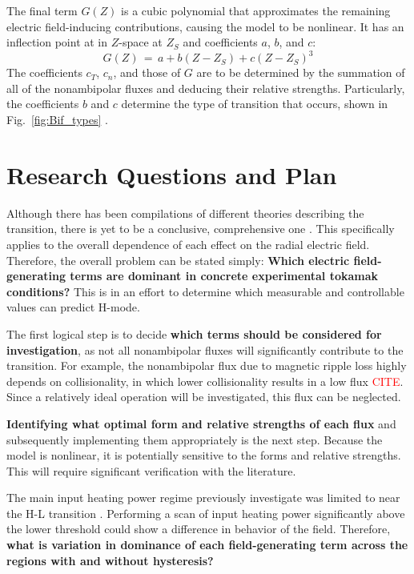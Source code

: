 \documentclass[a4paper]{article}
\newcommand\mynotes[1]{\textcolor{red}{#1}}
\begin{document}
The final term $G(Z)$ is a cubic polynomial that approximates the remaining electric field-inducing contributions, causing the model to be nonlinear.
It has an inflection point at in $Z$-space at $Z_S$ and coefficients $a$, $b$, and $c$:
\begin{equation}
	G(Z) \,=\, a + b(Z - Z_S) + c(Z - Z_S)^3
\end{equation}
The coefficients $c_T$, $c_n$, and those of $G$ are to be determined by the summation of all of the nonambipolar fluxes and deducing their relative strengths.
Particularly, the coefficients $b$ and $c$ determine the type of transition that occurs, shown in Fig.~\ref{fig:Bif_types} \cite{staps_backstepping_2017}.


\section{Research Questions and Plan}
Although there has been compilations of different theories describing the transition, there is yet to be a conclusive, comprehensive one \cite{connor_review_2000}.
This specifically applies to the overall dependence of each effect on the radial electric field.
Therefore, the overall problem can be stated simply: \textbf{Which electric field-generating terms are dominant in concrete experimental tokamak conditions?}
This is in an effort to determine which measurable and controllable values can predict H-mode.

The first logical step is to decide \textbf{which terms should be considered for investigation}, as not all nonambipolar fluxes will significantly contribute to the transition.
For example, the nonambipolar flux due to magnetic ripple loss highly depends on collisionality, in which lower collisionality results in a low flux \mynotes{CITE}.
Since a relatively ideal operation will be investigated, this flux can be neglected.

\textbf{Identifying what optimal form and relative strengths of each flux} and subsequently implementing them appropriately is the next step.
Because the model is nonlinear, it is potentially sensitive to the forms and relative strengths.
This will require significant verification with the literature.

The main input heating power regime previously investigate was limited to near the H-L transition \cite{staps_backstepping_2017}.
Performing a scan of input heating power significantly above the lower threshold could show a difference in behavior of the field.
Therefore, \textbf{what is variation in dominance of each field-generating term across the regions with and without hysteresis?}
\end{document}
